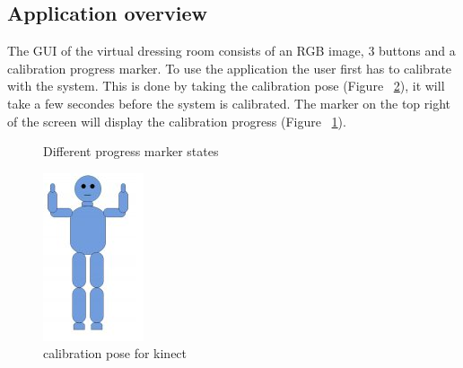 \documentclass[a4paper]{article}
\begin{document}
\subsection{Application overview}
\label{sec:application_overview}
The GUI of the virtual dressing room consists of an RGB image, 3 buttons and a calibration progress marker. To use the application the user first has to calibrate with the system. This is done by taking the calibration pose (Figure ~\ref{fig:calibrationPose}), it will take a few secondes before the system is calibrated. The marker on the top right of the screen will display the calibration progress (Figure ~\ref{fig:progressmarker}).
\begin{figure}[h!]
\centering
	\caption{Different progress marker states} 
	\label{fig:progressmarker}
\end{figure}

\begin{figure}
\centering
\includegraphics[scale=0.5]{calibrationPose.png} 
\caption{calibration pose for kinect}
\label{fig:calibrationPose}
\end{figure}
\end{document}
